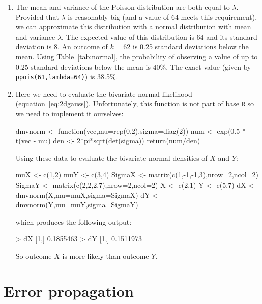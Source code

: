 \begin{enumerate}
\item The mean and variance of the Poisson distribution are both equal
  to $\lambda$.  Provided that $\lambda$ is reasonably big (and a
  value of 64 meets this requirement), we can approximate this
  distribution with a normal distribution with mean and variance
  $\lambda$. The expected value of this distribution is 64 and its
  standard deviation is 8. An outcome of $k=62$ is 0.25 standard
  deviations below the mean. Using Table~\ref{tab:normal}, the
  probability of observing a value of up to 0.25 standard deviations
  below the mean is 40\%. The exact value (given by
  \texttt{ppois(61,lambda=64)}) is 38.5\%.

\item Here we need to evaluate the bivariate normal likelihood
  (equation~\ref{eq:2dgauss}). Unfortunately, this function is not
  part of base \texttt{R} so we need to implement it ourselves:

\begin{script}
dmvnorm <- function(vec,mu=rep(0,2),sigma=diag(2)){
  num <- exp(0.5 * t(vec - mu) %
  den <- 2*pi*sqrt(det(sigma))
  return(num/den)
}
\end{script}

Using these data to evaluate the bivariate normal densities of $X$ and
$Y$:

\begin{script}[firstnumber=6]
muX <- c(1,2)
muY <- c(3,4)
SigmaX <- matrix(c(1,-1,-1,3),nrow=2,ncol=2)
SigmaY <- matrix(c(2,2,2,7),nrow=2,ncol=2)
X <- c(2,1)
Y <- c(5,7)
dX <- dmvnorm(X,mu=muX,sigma=SigmaX)
dY <- dmvnorm(Y,mu=muY,sigma=SigmaY)
\end{script}

\noindent which produces the following output:

\begin{console}
> dX
[1,] 0.1855463
> dY
[1,] 0.1511973
\end{console}

So outcome $X$ is more likely than outcome $Y$. 

\end{enumerate}

\section{Error propagation}
\label{sec:sol-errorprop}

